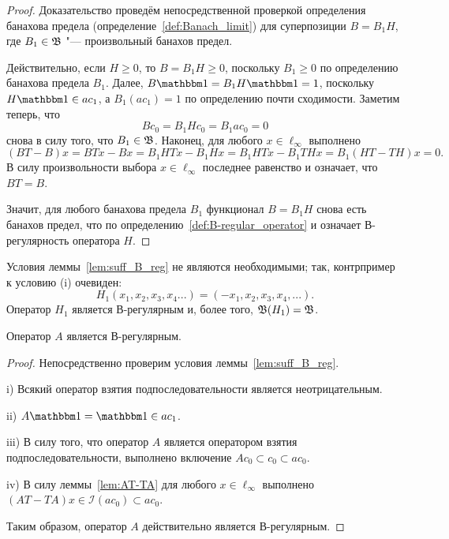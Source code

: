 \begin{proof}
	Доказательство проведём непосредственной проверкой определения банахова предела
	(определение~\ref{def:Banach_limit})
	для суперпозиции $B = B_1 H$,
	где $B_1 \in \mathfrak{B}$ "--- произвольный банахов предел.

	Действительно, если $H\geq 0$, то $B = B_1 H \geq 0$,
	поскольку $B_1 \geq 0$ по определению банахова предела $B_1$.
	Далее, $B\one = B_1 H \one = 1$, поскольку $H\one \in ac_1$,
	а $B_1(ac_1) = 1$ по определению почти сходимости.
	Заметим теперь, что
	\begin{equation}
		Bc_0 = B_1 H c_0 = B_1 ac_0 = 0
	\end{equation}
	снова в силу того, что $B_1\in\mathfrak{B}$.
	Наконец, для любого $x\in\ell_\infty$ выполнено
	\begin{equation}
		(BT-B)x = BTx - Bx = B_1 HTx - B_1 H x = B_1 HTx - B_1 T H x = B_1 (HT -  T H) x = 0
		.
	\end{equation}
	В силу произвольности выбора $x\in \ell_\infty$ последнее равенство и означает, что $BT=B$.

	Значит, для любого банахова предела $B_1$ функционал $B=B_1 H$ снова есть банахов предел,
	что по определению~\ref{def:B-regular_operator}
	и означает В-регулярность оператора $H$.
\end{proof}

\begin{remark}
	Условия леммы~\ref{lem:suff_B_reg} не являются необходимыми;
	так, контрпример к условию (i) очевиден:
	\begin{equation}
		H_1(x_1,x_2,x_3,x_4...) = (-x_1, x_2, x_3, x_4, ...)
		.
	\end{equation}
	Оператор $H_1$ является В-регулярным и, более того, $\mathfrak{B}(H_1) = \mathfrak{B}$.
\end{remark}


\begin{lemma}
	\label{thm:A_block_thrower_is_B-regular}
	Оператор $A$ является В-регулярным.
\end{lemma}

\begin{proof}
	Непосредственно проверим условия леммы~\ref{lem:suff_B_reg}.

	i) Всякий оператор взятия подпоследовательности является неотрицательным.

	ii) $A\one = \one \in ac_1$.

	iii)  В силу того, что оператор $A$ является оператором взятия подпоследовательности,
	выполнено включение $Ac_0 \subset c_0 \subset ac_0$.

	iv) В силу леммы~\ref{lem:AT-TA} для любого $x\in \ell_\infty$ выполнено $(AT-TA)x \in \mathcal{I}(ac_0) \subset ac_0$.

	Таким образом, оператор $A$ действительно является В-регулярным.
\end{proof}

